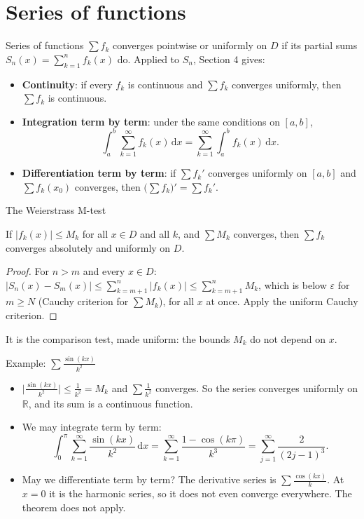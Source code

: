 \documentclass{wosm-slides}
\newcommand{\R}{\mathbb{R}}
\newcommand{\dx}{\,\mathrm{d}x}
\begin{document}
\section{Series of functions}

\begin{frame}{Series of functions}
  $\sum f_k$ converges pointwise or uniformly on $D$ if its partial sums
  $S_n(x) = \sum_{k=1}^n f_k(x)$ do. Applied to $S_n$, Section 4 gives:
  \begin{itemize}
    \item \textbf{Continuity}: if every $f_k$ is continuous and $\sum f_k$ converges uniformly,
      then $\sum f_k$ is continuous.
    \item \textbf{Integration term by term}: under the same conditions on $[a, b]$,
      \[ \int_a^b \sum_{k=1}^\infty f_k(x)\dx = \sum_{k=1}^\infty \int_a^b f_k(x)\dx . \]
    \item \textbf{Differentiation term by term}: if $\sum f_k'$ converges uniformly on
      $[a, b]$ and $\sum f_k(x_0)$ converges, then
      $\bigl(\sum f_k\bigr)' = \sum f_k'$.
  \end{itemize}
\end{frame}

\begin{frame}{The Weierstrass M-test}
  \begin{theorem}
    If $|f_k(x)| \le M_k$ for all $x \in D$ and all $k$, and $\sum M_k$ converges, then
    $\sum f_k$ converges absolutely and uniformly on $D$.
  \end{theorem}
  \pause
  \begin{proof}
    For $n > m$ and every $x \in D$:
    $|S_n(x) - S_m(x)| \le \sum_{k=m+1}^{n} |f_k(x)| \le \sum_{k=m+1}^{n} M_k$,
    which is below $\varepsilon$ for $m \ge N$ (Cauchy criterion for $\sum M_k$), for all $x$
    at once. Apply the uniform Cauchy criterion.
  \end{proof}
  It is the comparison test, made uniform: the bounds $M_k$ do not depend on $x$.
\end{frame}

\begin{frame}{Example: $\sum \frac{\sin(kx)}{k^2}$}
  \begin{itemize}
    \item $\bigl|\frac{\sin(kx)}{k^2}\bigr| \le \frac{1}{k^2} = M_k$ and $\sum \frac{1}{k^2}$
      converges. So the series converges uniformly on $\R$, and its sum is a continuous function.
    \item We may integrate term by term:
      \[ \int_0^\pi \sum_{k=1}^\infty \frac{\sin(kx)}{k^2}\dx
         = \sum_{k=1}^\infty \frac{1 - \cos(k\pi)}{k^3}
         = \sum_{j=1}^\infty \frac{2}{(2j-1)^3} . \]
    \item May we differentiate term by term? The derivative series is
      $\sum \frac{\cos(kx)}{k}$. At $x = 0$ it is the harmonic series, so it does not even
      converge everywhere. The theorem does not apply.
  \end{itemize}
\end{frame}
\end{document}
